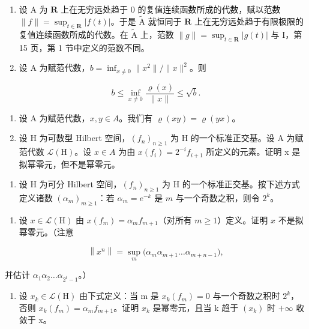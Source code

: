 \begin{enumerate}
\def\labelenumi{\arabic{enumi})}
\setcounter{enumi}{7}
\item
  设 A 为 \(\mathbf{R}\) 上在无穷远处趋于 0 的复值连续函数所成的代数，赋以范数 \(\|f\| = \sup_{t\in\mathbf{R}} |f(t)|\)。于是 \(\widetilde{\mathrm{A}}\) 就恒同于 \(\mathbf{R}\) 上在无穷远处趋于有限极限的复值连续函数所成的代数。在 \(\widetilde{\mathrm{A}}\) 上，范数 \(\|g\| = \sup_{t\in\mathbf{R}} |g(t)|\) 与 I，第 15 页，第 1 节中定义的范数不同。
\item
  设 A 为赋范代数，\(b = \inf_{x \neq 0} \|x^{2}\|/\|x\|^{2}\)。则
\end{enumerate}

\[
b \leqslant \inf _ {x \neq 0} \frac {\varrho (x)}{\| x \|} \leqslant \sqrt {b}.
\]

\begin{enumerate}
\def\labelenumi{\arabic{enumi})}
\setcounter{enumi}{9}
\item
  设 A 为赋范代数，\(x, y \in A\)。我们有 \(\varrho(xy) = \varrho(yx)\)。
\item
  设 H 为可数型 Hilbert 空间，\((f_{n})_{n\geqslant1}\) 为 H 的一个标准正交基。设 A 为赋范代数 \(\mathcal{L}(\mathrm{H})\)。设 \(x\in A\) 为由 \(x(f_{i})=2^{-i}f_{i+1}\) 所定义的元素。证明 x 是拟幂零元，但不是幂零元。
\end{enumerate}

\begin{enumerate}
\def\labelenumi{¶ \arabic{enumi})}
\setcounter{enumi}{11}
\tightlist
\item
  设 H 为可分 Hilbert 空间，\((f_n)_{n \geqslant 1}\) 为 H 的一个标准正交基。按下述方式定义诸数 \((\alpha_m)_{m \geqslant 1}\)：若 \(\alpha_m = e^{-k}\) 是 \(m\) 与一个奇数之积，则令 \(2^k\)。
\end{enumerate}

\begin{enumerate}
\def\labelenumi{\alph{enumi})}
\tightlist
\item
  设 \(x \in \mathcal{L}(\mathrm{H})\) 由 \(x(f_m) = \alpha_m f_{m+1}\)（对所有 \(m \geqslant 1\)）定义。证明 \(x\) 不是拟幂零元。（注意
\end{enumerate}

\[
\left\| x ^ {n} \right\| = \sup _ {m} \bigl (\alpha_ {m} \alpha_ {m + 1} \dots \alpha_ {m + n - 1} \bigr),
\]

并估计 \(\alpha_{1}\alpha_{2}\ldots\alpha_{2^{t}-1}\)。）

\begin{enumerate}
\def\labelenumi{\alph{enumi})}
\setcounter{enumi}{1}
\tightlist
\item
  设 \(x_{k} \in \mathcal{L}(\mathrm{H})\) 由下式定义：当 m 是 \(x_{k}(f_{m}) = 0\) 与一个奇数之积时 \(2^{k}\)，否则 \(x_{k}(f_{m}) = \alpha_{m} f_{m+1}\)。证明 \(x_{k}\) 是幂零元，且当 k 趋于 \((x_{k})\) 时 \(+\infty\) 收敛于 x。
\end{enumerate}

